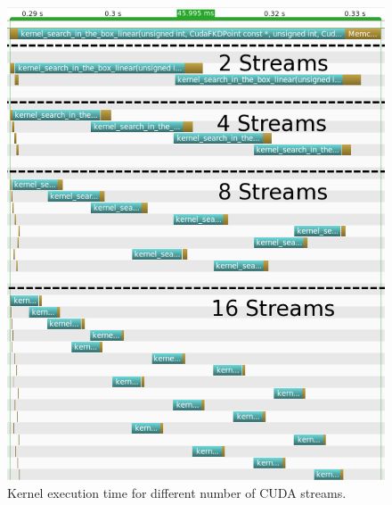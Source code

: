 \begin{figure}
\includegraphics[width=\textwidth]{fkdtree/nvvp_streams.png}
\caption{Kernel execution time for different number of CUDA streams.}
\label{nvvp_streams}
\end{figure}